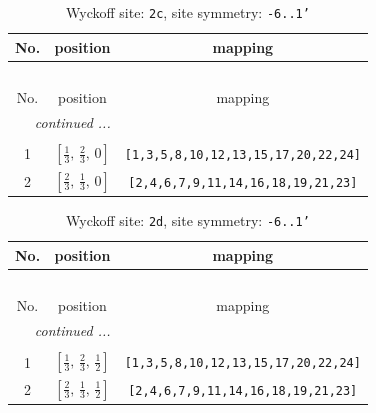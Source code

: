 \documentclass[fleqn,8pt]{jsarticle}
\begin{document}
\begin{longtable}{ccc}
\caption{Wyckoff site: {\tt 2c}, site symmetry: {\tt -6..1'}}
 \\
 \hline \hline
No. & position & mapping \\ \hline \endfirsthead

\multicolumn{2}{l}{\tablename\ \thetable{}} \\
 \hline \hline
No. & position & mapping \\ \hline \endhead

 \hline \hline
\multicolumn{2}{r}{\footnotesize\it continued ...} \\ \endfoot

 \hline \hline
\multicolumn{2}{r}{} \\ \endlastfoot

1 & $\left[ \frac{1}{3},\, \frac{2}{3},\, 0 \right]$ & {\tt [1,3,5,8,10,12,13,15,17,20,22,24]} \\ \hline
2 & $\left[ \frac{2}{3},\, \frac{1}{3},\, 0 \right]$ & {\tt [2,4,6,7,9,11,14,16,18,19,21,23]} \\
\end{longtable}
\renewcommand{\arraystretch}{1.2}
\begin{longtable}{ccc}
\caption{Wyckoff site: {\tt 2d}, site symmetry: {\tt -6..1'}}
 \\
 \hline \hline
No. & position & mapping \\ \hline \endfirsthead

\multicolumn{2}{l}{\tablename\ \thetable{}} \\
 \hline \hline
No. & position & mapping \\ \hline \endhead

 \hline \hline
\multicolumn{2}{r}{\footnotesize\it continued ...} \\ \endfoot

 \hline \hline
\multicolumn{2}{r}{} \\ \endlastfoot

1 & $\left[ \frac{1}{3},\, \frac{2}{3},\, \frac{1}{2} \right]$ & {\tt [1,3,5,8,10,12,13,15,17,20,22,24]} \\ \hline
2 & $\left[ \frac{2}{3},\, \frac{1}{3},\, \frac{1}{2} \right]$ & {\tt [2,4,6,7,9,11,14,16,18,19,21,23]} \\
\end{longtable}
\renewcommand{\arraystretch}{1.2}
\end{document}
